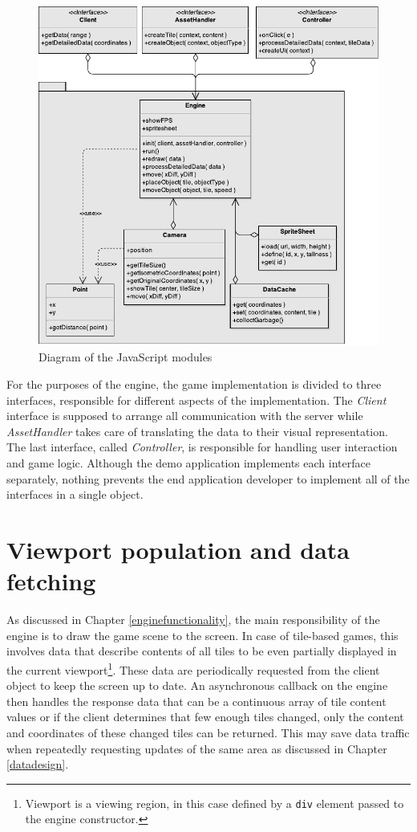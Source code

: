 \documentclass[11pt,oneside, final]{fithesis2}
\begin{document}
\begin{figure}[h]
	\centering
	\includegraphics[width=\textwidth]{thesis-classdiagram}
	\caption{Diagram of the JavaScript modules}
	\label{classdiagram}
\end{figure}

For the purposes of the engine, the game implementation is divided to three interfaces, responsible for different aspects of the implementation. The \emph{Client} interface is supposed to arrange all communication with the server while \emph{AssetHandler} takes care of translating the data to their visual representation. The last interface, called \emph{Controller}, is responsible for handling user interaction and game logic. Although the demo application implements each interface separately, nothing prevents the end application developer to implement all of the interfaces in a single object.

\section{Viewport population and data fetching}
As discussed in Chapter \ref{enginefunctionality}, the main responsibility of the engine is to draw the game scene to the screen. In case of tile-based games, this involves data that describe contents of all tiles to be even partially displayed in the current viewport\footnote{Viewport is a viewing region, in this case defined by a \texttt{div} element passed to the engine constructor.}. These data are periodically requested from the client object to keep the screen up to date. An asynchronous callback on the engine then handles the response data that can be a continuous array of tile content values or if the client determines that few enough tiles changed, only the content and coordinates of these changed tiles can be returned. This may save data traffic when repeatedly requesting updates of the same area as discussed in Chapter \ref{datadesign}.
\end{document}
